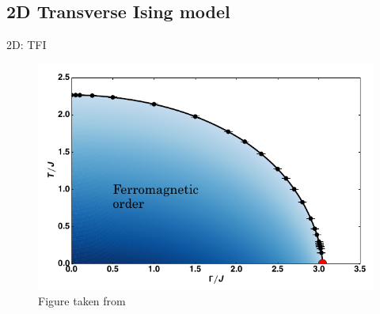 \subsection{2D Transverse Ising model}

\begin{frame}{2D: TFI}
    \begin{figure}
        \centering
        \includegraphics[width=0.75 \linewidth]{../Figuren/phsyics/2disingphase.png}
        \caption{Figure taken from \cite{Hesselmann2016}  }
    \end{figure}
\end{frame}

